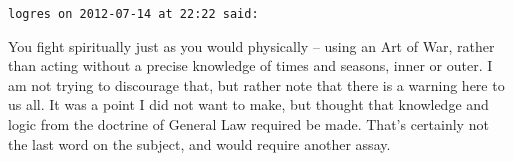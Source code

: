 \begin{footnotesize}
\begin{sffamily}
\hfill

\texttt{logres on 2012-07-14 at 22:22 said:}

You fight spiritually just as you would physically -- using an Art of War, rather than acting without a precise knowledge of times and seasons, inner or outer. I am not trying to discourage that, but rather note that there is a warning here to us all. It was a point I did not want to make, but thought that knowledge and logic from the doctrine of General Law required be made. That's certainly not the last word on the subject, and would require another assay.


\hfill

\end{sffamily}
\end{footnotesize}

